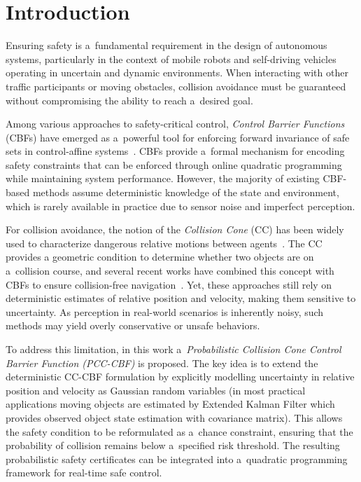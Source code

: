 \documentclass{svproc}
\begin{document}
\section{Introduction}
Ensuring safety is a~fundamental requirement in the design of autonomous systems, 
particularly in the context of mobile robots and self-driving vehicles operating 
in uncertain and dynamic environments.
When interacting with other traffic participants or moving obstacles, collision
avoidance must be guaranteed without compromising the ability to reach a~desired
goal. 

Among various approaches to safety-critical control, \emph{Control Barrier
Functions} (CBFs) have emerged as a~powerful tool for enforcing forward
invariance of safe sets in control-affine systems~\cite{ames2017control}. 
CBFs provide a~formal mechanism for encoding safety constraints that can be enforced 
through online quadratic programming while maintaining system performance. 
However, the majority of existing CBF-based methods assume deterministic knowledge 
of the state and environment, which is rarely available in practice due to 
sensor noise and imperfect perception.

For collision avoidance, the notion of the \emph{Collision Cone} (CC) has been 
widely used to characterize dangerous relative motions between agents~\cite{thontepu2022collision}.
The CC provides a geometric condition to determine  whether two objects are on
a~collision course, and several recent works have combined this concept with
CBFs to ensure collision-free navigation~\cite{wang2022observer}.
Yet, these approaches still rely on deterministic estimates of relative position
and velocity, making them sensitive to uncertainty. 
As perception in real-world scenarios is inherently noisy, 
such methods may yield overly conservative or unsafe behaviors.

To address this limitation, in this work a~\emph{Probabilistic
Collision Cone Control Barrier Function (PCC-CBF)} is proposed. 
The key idea is to extend the deterministic CC-CBF formulation by 
explicitly modelling uncertainty in relative position and velocity 
as Gaussian random variables (in most practical applications moving objects
are estimated by Extended Kalman Filter which provides observed object state
estimation with covariance matrix).
This allows the safety condition to be reformulated as a~chance constraint,
ensuring that the probability of collision remains below a~specified risk threshold. 
The resulting probabilistic safety certificates can be integrated 
into a~quadratic programming framework for real-time safe control.
\end{document}
